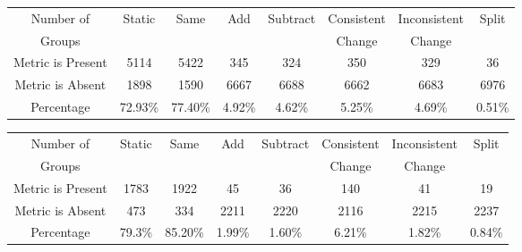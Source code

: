 \begin{table}[htbp]
\vspace{0.5em}
\centering\wuhao
\begin{tabular}{cccccccc}
\toprule[1.5pt]
Number of&\multirow{2}{*}{Static}&\multirow{2}{*}{Same}&\multirow{2}{*}{Add}&\multirow{2}{*}{Subtract}&Consistent&Inconsistent&\multirow{2}{*}{Split}\\ 
Groups&&&&&Change&Change&\\ 
\midrule[1pt]
Metric is Present	&5114	&5422	&345	&324	&350	&329	&36\\ 
Metric is Absent	&1898	&1590	&6667	&6688	&6662	&6683	&6976\\ 
Percentage	&72.93\%	&77.40\%	&4.92\%	&4.62\%	&5.25\%	&4.69\%	&0.51\%\\ 
\bottomrule[1.5pt]
\end{tabular}
\end{table}

\begin{table}[htbp]
\vspace{0.5em}\centering\wuhao
\begin{tabular}{cccccccc}
\toprule[1.5pt]
Number of&\multirow{2}{*}{Static}&\multirow{2}{*}{Same}&\multirow{2}{*}{Add}&\multirow{2}{*}{Subtract}&Consistent&Inconsistent&\multirow{2}{*}{Split}\\ 
Groups&&&&&Change&Change&\\ 
\midrule[1pt]
Metric is Present	&1783	&1922	&45	&36	&140	&41	&19\\ 
Metric is Absent	&473	&334	&2211	&2220	&2116	&2215	&2237\\ 
Percentage	&79.3\%	&85.20\%	&1.99\%	&1.60\%	&6.21\%	&1.82\%	&0.84\%\\ 
\bottomrule[1.5pt]
\end{tabular}
\end{table}

